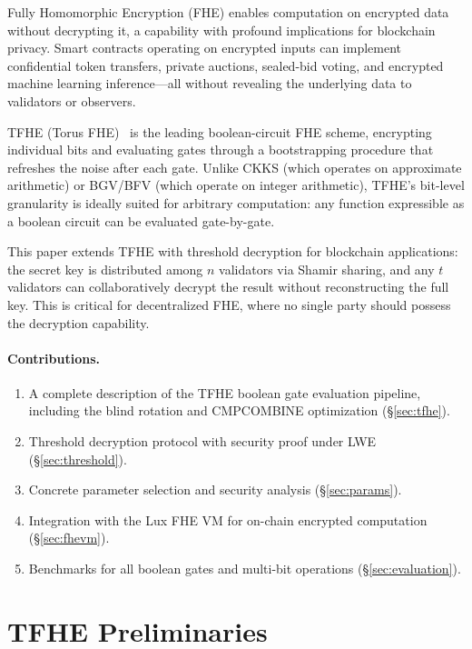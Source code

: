 \documentclass[11pt,a4paper]{article}
\begin{document}
Fully Homomorphic Encryption (FHE) enables computation on encrypted data without
decrypting it, a capability with profound implications for blockchain privacy.
Smart contracts operating on encrypted inputs can implement confidential token transfers,
private auctions, sealed-bid voting, and encrypted machine learning inference---all
without revealing the underlying data to validators or observers.

TFHE (Torus FHE)~\cite{chillotti2020tfhe} is the leading boolean-circuit FHE scheme,
encrypting individual bits and evaluating gates through a bootstrapping procedure that
refreshes the noise after each gate. Unlike CKKS (which operates on approximate
arithmetic) or BGV/BFV (which operate on integer arithmetic), TFHE's bit-level
granularity is ideally suited for arbitrary computation: any function expressible as a
boolean circuit can be evaluated gate-by-gate.

This paper extends TFHE with threshold decryption for blockchain applications: the secret
key is distributed among $n$ validators via Shamir sharing, and any $t$ validators can
collaboratively decrypt the result without reconstructing the full key. This is critical
for decentralized FHE, where no single party should possess the decryption capability.

\paragraph{Contributions.}
\begin{enumerate}[nosep]
\item A complete description of the TFHE boolean gate evaluation pipeline, including
the blind rotation and CMPCOMBINE optimization (\S\ref{sec:tfhe}).
\item Threshold decryption protocol with security proof under LWE (\S\ref{sec:threshold}).
\item Concrete parameter selection and security analysis (\S\ref{sec:params}).
\item Integration with the Lux FHE VM for on-chain encrypted computation (\S\ref{sec:fhevm}).
\item Benchmarks for all boolean gates and multi-bit operations (\S\ref{sec:evaluation}).
\end{enumerate}

\section{TFHE Preliminaries}
\label{sec:prelim}
\end{document}
